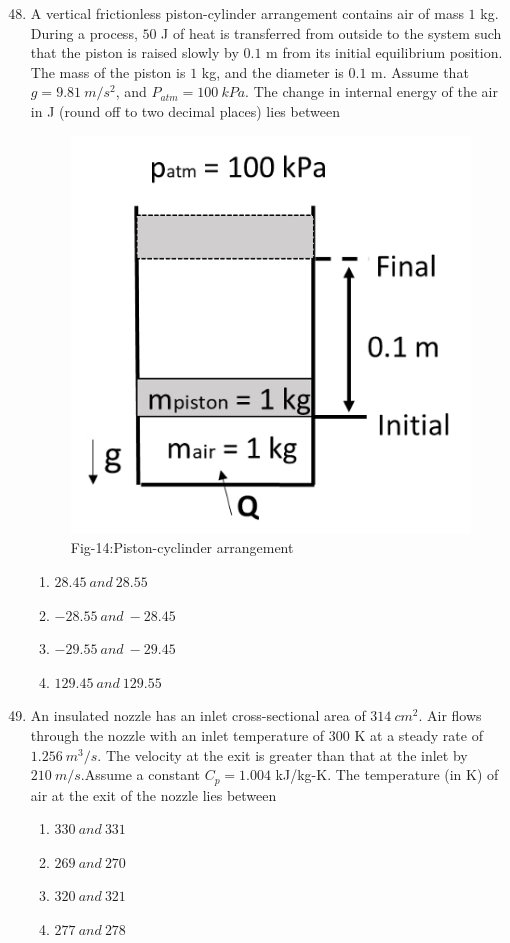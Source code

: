 \documentclass[journal]{IEEEtran}
\theoremstyle{remark}
\begin{document}
\begin{enumerate}[itemsep=1em]
\setcounter{enumi}{47}
\item A vertical frictionless piston-cylinder arrangement contains air of mass $1$ kg. During a process, $50$ J of heat is transferred from outside to the system such that the piston is raised slowly by $0.1$ m from its initial equilibrium position. The mass of the piston is $1$ kg, and the diameter is $0.1$ m. Assume that $g = 9.81\ m/s^2$, and $P_{atm} = 100\ kPa$. The change in internal energy of the air in J (round off to two 
decimal places) lies between
\begin{figure}[H]
    \centering
    \includegraphics[width=0.4\columnwidth]{figs/fig-14.jpeg}
    \caption*{Fig-14:Piston-cyclinder arrangement}
    \label{fig-14}
\end{figure}
\newpage
\vspace*{0.25cm}
\begin{enumerate}[leftmargin=2.5em, labelsep=0.5em, itemsep=0.5em]
    \item $28.45 \ and \ 28.55$
    \item $-28.55 \ and \ -28.45$
    \item $-29.55 \ and \ -29.45 $
    \item $129.45 \ and \ 129.55 $
\end{enumerate}

\end{enumerate}

\begin{enumerate}[itemsep=1em]
\setcounter{enumi}{48}
\item An insulated nozzle has an inlet cross-sectional area of $314\ cm^2$. Air flows through the nozzle with an inlet temperature of $300$ K at a steady rate of $1.256\ m^3/s$. The velocity at the exit is greater than that at the inlet by $210\ m/s$.Assume a constant $C_p = 1.004$ kJ/kg-K. The temperature (in K) of air at the exit of the nozzle lies between   
\begin{multicols}{4}
\begin{enumerate}
    \item $330\ and \ 331 $
    \item $269\ and \ 270 $
    \item $320\ and \ 321 $
    \item $277\ and \ 278 $
    
\end{enumerate}
\end{multicols}
\end{enumerate}
\end{document}

